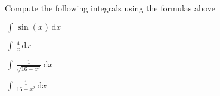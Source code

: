 \documentclass[addpoints]{exam}
\theoremstyle{definition}
\theoremstyle{plain}
\begin{document}
Compute the following integrals using the formulas above
\begin{questions}
    \question $\displaystyle\,\int\,\sin\left(x\right)\,\mathrm{d}x$
    
    \question $\displaystyle\,\int\,\frac{4}{x}\,\mathrm{d}x$
    
    \question $\displaystyle\,\int\,\frac{1}{\sqrt{16-x^2}}\,\mathrm{d}x$
    
    \question $\displaystyle\,\int\,\frac{1}{{16-x^2}}\,\mathrm{d}x$
\end{questions}

\newpage 
\end{document}
